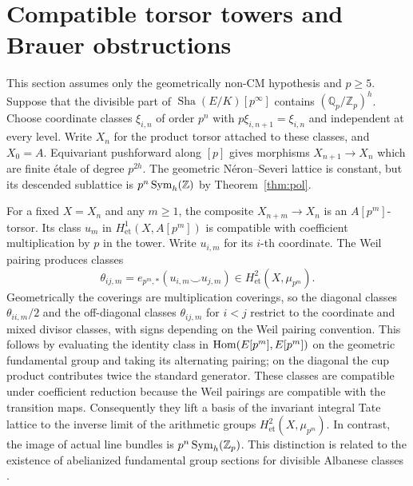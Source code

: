 \documentclass[11pt,a4paper]{article}
\theoremstyle{definition}\newtheorem{definition}[theorem]{Definition}
\theoremstyle{remark}\newtheorem{remark}[theorem]{Remark}
\newcommand{\Sha}{\operatorname{\mathrm{Sha}}}
\newcommand{\ZZ}{\mathbb Z}\newcommand{\QQ}{\mathbb Q}\newcommand{\FF}{\mathbb F}
\numberwithin{equation}{section}
\begin{document}
\section{Compatible torsor towers and Brauer obstructions}
This section assumes only the geometrically non-CM hypothesis and $p\geq5$. Suppose that the divisible part of $\Sha(E/K)[p^\infty]$ contains $(\QQ_p/\ZZ_p)^h$. Choose coordinate classes $\xi_{i,n}$ of order $p^n$ with $p\xi_{i,n+1}=\xi_{i,n}$ and independent at every level. Write $X_n$ for the product torsor attached to these classes, and $X_0=A$. Equivariant pushforward along $[p]$ gives morphisms $X_{n+1}\to X_n$ which are finite \'etale of degree $p^{2h}$. The geometric N\'{e}ron--Severi lattice is constant, but its descended sublattice is $p^n\Sym_h(\ZZ)$ by Theorem~\ref{thm:pol}.

For a fixed $X=X_n$ and any $m\geq1$, the composite $X_{n+m}\to X_n$ is an $A[p^m]$-torsor. Its class $u_m$ in $H^1_{\mathrm{et}}(X,A[p^m])$ is compatible with coefficient multiplication by $p$ in the tower. Write $u_{i,m}$ for its $i$-th coordinate. The Weil pairing produces classes
\[
\theta_{ij,m}=e_{p^m,*}(u_{i,m}\smile u_{j,m})\in H^2_{\mathrm{et}}(X,\mu_{p^m}).
\]
Geometrically the coverings are multiplication coverings, so the diagonal classes $\theta_{ii,m}/2$ and the off-diagonal classes $\theta_{ij,m}$ for $i<j$ restrict to the coordinate and mixed divisor classes, with signs depending on the Weil pairing convention. This follows by evaluating the identity class in $\operatorname{Hom}(E[p^m],E[p^m])$ on the geometric fundamental group and taking its alternating pairing; on the diagonal the cup product contributes twice the standard generator. These classes are compatible under coefficient reduction because the Weil pairings are compatible with the transition maps. Consequently they lift a basis of the invariant integral Tate lattice to the inverse limit of the arithmetic groups $H^2_{\mathrm{et}}(X,\mu_{p^m})$. In contrast, the image of actual line bundles is $p^n\Sym_h(\ZZ_p)$. This distinction is related to the existence of abelianized fundamental group sections for divisible Albanese classes \cite{HS}.
\end{document}
